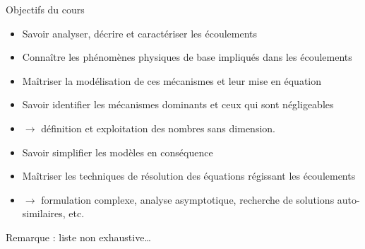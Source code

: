 \begin{frame}{Objectifs du cours}

\small

\begin{itemize}
\item[\checkmark]
	Savoir analyser, décrire et caractériser les écoulements 
\item[\checkmark]
	Connaître les phénomènes physiques de base impliqués dans les écoulements
\item[\checkmark]
	Maîtriser la modélisation de ces mécanismes et leur mise en équation
\item[\checkmark]
	Savoir identifier les mécanismes dominants et ceux qui sont négligeables
\item[]
	$\rightarrow$ définition et exploitation des nombres sans dimension.
\item[\checkmark]
	Savoir simplifier les modèles en conséquence
\item[\checkmark]
	Maîtriser les techniques de résolution des équations régissant les écoulements 
\item[]
	$\rightarrow$ formulation complexe, analyse asymptotique, recherche de solutions auto-similaires, etc.
\end{itemize}

\bigskip

\hfill Remarque : liste non exhaustive\ldots

\vspace{20mm}

\end{frame}


